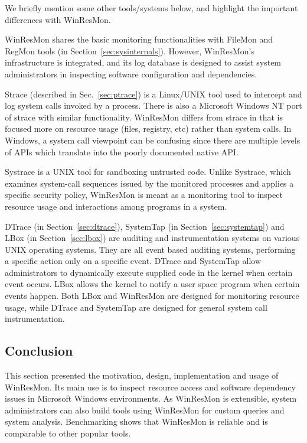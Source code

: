 We briefly mention some other tools/systems below, and highlight the important
differences with WinResMon.

WinResMon shares the basic monitoring functionalities with
FileMon and RegMon tools (in Section~\ref{sec:sysinternals}).
However, WinResMon's
infrastructure is integrated, and its log database is designed to assist
system administrators in inspecting software configuration and dependencies.

Strace (described in Sec.~\ref{sec:ptrace}) is a Linux/UNIX tool used to intercept and log system
calls invoked by a process.  There is also a Microsoft Windows NT port of
strace with similar functionality.  WinResMon differs from
strace in that is focused more on resource usage (files, registry, etc) rather
than system calls.  In Windows, a system call viewpoint can be
confusing since there are multiple levels of APIs which translate into the poorly
documented native API.

Systrace \cite{provos2003improving} is a UNIX tool for sandboxing untrusted code.  Unlike
Systrace, which examines system-call sequences issued by the monitored
processes and applies a specific security policy, WinResMon is meant as a
monitoring tool to inspect resource usage and interactions among programs in a
system.

DTrace (in Section~\ref{sec:dtrace}),
SystemTap (in Section~\ref{sec:systemtap}) and
LBox (in Section~\ref{sec:lbox}) are
auditing and instrumentation systems on various UNIX operating systems.  They
are all event based auditing systems, performing a specific action only on a
specific event.  DTrace and SystemTap allow administrators to dynamically
execute supplied code in the kernel when certain event occurs.  LBox allows
the kernel to notify a user space program when certain events happen.  Both
LBox and WinResMon are designed for monitoring resource usage, while DTrace and
SystemTap are designed for general system call instrumentation.


\subsection{Conclusion}

This section presented the motivation, design, implementation and usage of
WinResMon.  Its main use is to inspect resource access and software dependency
issues in Microsoft Windows environments.  As WinResMon is extensible, system
administrators can also build tools using WinResMon for custom queries and
system analysis.  Benchmarking shows that WinResMon is reliable and is
comparable to other popular tools.

